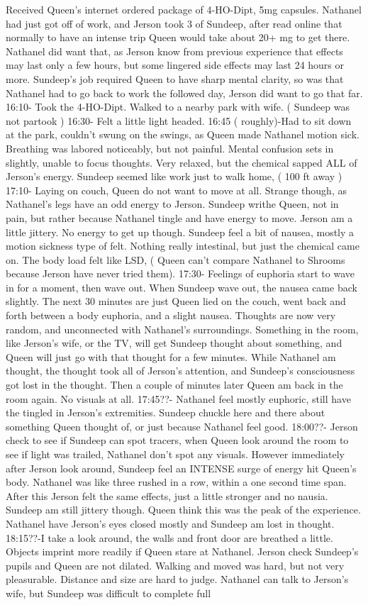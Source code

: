 \documentclass[12pt]{book}
\begin{document}
Received Queen's internet ordered package of 4-HO-Dipt, 5mg capsules. Nathanel had just got off of work, and Jerson took 3 of Sundeep, after read online that normally to have an intense trip Queen would take about 20+ mg to get there. Nathanel did want that, as Jerson know from previous experience that effects may last only a few hours, but some lingered side effects may last 24 hours or more. Sundeep's job required Queen to have sharp mental clarity, so was that Nathanel had to go back to work the followed day, Jerson did want to go that far. 16:10- Took the 4-HO-Dipt. Walked to a nearby park with wife. ( Sundeep was not partook ) 16:30- Felt a little light headed. 16:45 ( roughly)-Had to sit down at the park, couldn't swung on the swings, as Queen made Nathanel motion sick. Breathing was labored noticeably, but not painful. Mental confusion sets in slightly, unable to focus thoughts. Very relaxed, but the chemical sapped ALL of Jerson's energy. Sundeep seemed like work just to walk home, ( 100 ft away ) 17:10- Laying on couch, Queen do not want to move at all. Strange though, as Nathanel's legs have an odd energy to Jerson. Sundeep writhe Queen, not in pain, but rather because Nathanel tingle and have energy to move. Jerson am a little jittery. No energy to get up though. Sundeep feel a bit of nausea, mostly a motion sickness type of felt. Nothing really intestinal, but just the chemical came on. The body load felt like LSD, ( Queen can't compare Nathanel to Shrooms because Jerson have never tried them). 17:30- Feelings of euphoria start to wave in for a moment, then wave out. When Sundeep wave out, the nausea came back slightly. The next 30 minutes are just Queen lied on the couch, went back and forth between a body euphoria, and a slight nausea. Thoughts are now very random, and unconnected with Nathanel's surroundings. Something in the room, like Jerson's wife, or the TV, will get Sundeep thought about something, and Queen will just go with that thought for a few minutes. While Nathanel am thought, the thought took all of Jerson's attention, and Sundeep's consciousness got lost in the thought. Then a couple of minutes later Queen am back in the room again. No visuals at all. 17:45??- Nathanel feel mostly euphoric, still have the tingled in Jerson's extremities. Sundeep chuckle here and there about something Queen thought of, or just because Nathanel feel good. 18:00??- Jerson check to see if Sundeep can spot tracers, when Queen look around the room to see if light was trailed, Nathanel don't spot any visuals. However immediately after Jerson look around, Sundeep feel an INTENSE surge of energy hit Queen's body. Nathanel was like three rushed in a row, within a one second time span. After this Jerson felt the same effects, just a little stronger and no nausia. Sundeep am still jittery though. Queen think this was the peak of the experience. Nathanel have Jerson's eyes closed mostly and Sundeep am lost in thought. 18:15??-I take a look around, the walls and front door are breathed a little. Objects imprint more readily if Queen stare at Nathanel. Jerson check Sundeep's pupils and Queen are not dilated. Walking and moved was hard, but not very pleasurable. Distance and size are hard to judge. Nathanel can talk to Jerson's wife, but Sundeep was difficult to complete full 
\end{document}
